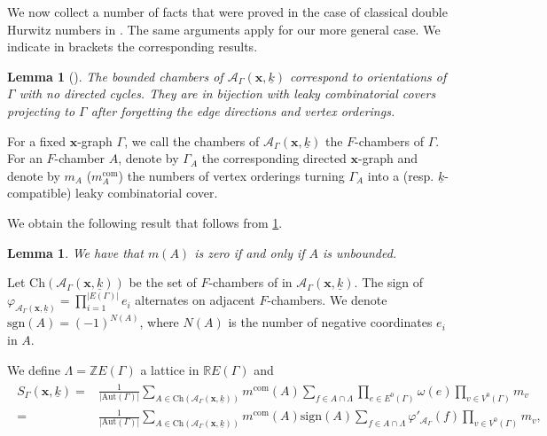 \documentclass[10pt,a4paper,oneside,no-math,reqno]{amsart}%
\theoremstyle{plain}
\newtheorem{lemma}[theorem]{Lemma}
\theoremstyle{definition}
\theoremstyle{remark}
\numberwithin{equation}{section}
\renewcommand{\phi}{\varphi}
\newcommand{\1}{\mathds{1}}
\newcommand{\<}{\langle}
\renewcommand{\>}{\rangle}
\begin{document}
We now collect a number of facts that were proved in the case of classical double Hurwitz numbers in \cite{CJM11}. The same arguments apply for our more general case. We indicate in brackets the corresponding results.

\begin{lemma}[{\cite[Lemma 2.13, Corollary 2.14]{CJM11}}]
\label{lem-bound}
    The bounded chambers of $\mathcal{A}_\Gamma(\textbf{x},\underline{k})$ correspond to orientations of $\Gamma$ with no directed cycles. They are in bijection with leaky combinatorial covers projecting to $\Gamma$ after forgetting the edge directions and vertex orderings.
\end{lemma}

For a fixed $\textbf{x}$-graph $\Gamma$, we call the chambers of $\mathcal{A}_\Gamma(\textbf{x},\underline{k})$ the $F$-chambers of $\Gamma$. For an $F$-chamber $A$, denote by $\Gamma_A$ the corresponding directed $\textbf{x}$-graph and denote by $m_A$ ($m_A^{\textrm{com}}$) the numbers of vertex orderings turning $\Gamma_A$ into a (resp. $\underline{k}$-compatible) leaky combinatorial cover.

We obtain the following result that follows from \cref{lem-bound}.

\begin{lemma}
    We have that $m(A)$ is zero if and only if $A$ is unbounded.
\end{lemma}

Let $\mathrm{Ch}(\mathcal{A}_\Gamma(\textbf{x},\underline{k}))$ be the set of $F$-chambers of in $\mathcal{A}_\Gamma(\textbf{x},\underline{k})$. The sign of $\phi_{\mathcal{A}_\Gamma(\textbf{x},\underline{k})}=\prod_{i=1}^{|E(\Gamma)|}e_i$ alternates on adjacent $F$-chambers. We denote $\mathrm{sgn}(A)=(-1)^{N(A)}$, where $N(A)$ is the number of negative coordinates $e_i$ in $A$.


We define $\Lambda=\mathbb{Z}E(\Gamma)$ a lattice in $\mathbb{R}E(\Gamma)$ and
\begin{align}
    \begin{split}
        S_\Gamma(\textbf{x},\underline{k})=&\frac{1}{|\mathrm{Aut}(\Gamma)|}\sum_{A\in\mathrm{Ch}(\mathcal{A}_\Gamma(\textbf{x},\underline{k}))}m^{\mathrm{com}}(A)\sum_{f\in A\cap \Lambda}\prod_{e\in E^0(\Gamma)}\omega(e)\prod_{v\in V^0(\Gamma)}m_v\\
        =&\frac{1}{|\mathrm{Aut}(\Gamma)|}\sum_{A\in\mathrm{Ch}(\mathcal{A}_\Gamma(\textbf{x},\underline{k}))}m^{\mathrm{com}}(A)\mathrm{sign}(A)\sum_{f\in A\cap \Lambda}\phi'_{\mathcal{A}_\Gamma}(f)\prod_{v\in V^0(\Gamma)}m_v,
    \end{split}
\end{align}
\end{document}
